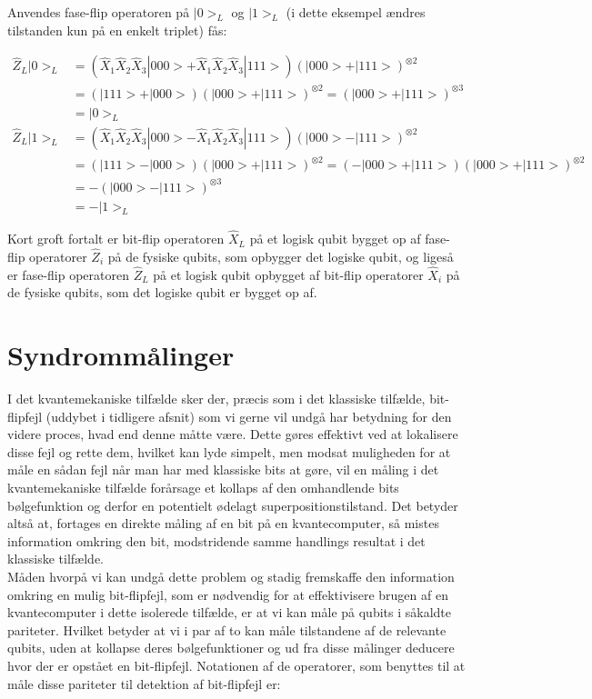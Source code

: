 \documentclass[a4paper,oneside,article]{memoir}
\begin{document}
Anvendes fase-flip operatoren på $|0>_L$ og $|1>_L$ (i dette eksempel ændres tilstanden kun på en enkelt triplet) fås:

\begin{align*}
    \hat{Z}_L|0>_L &= (\hat{X}_1\hat{X}_2\hat{X}_3|000> + \hat{X}_1\hat{X}_2\hat{X}_3|111>)(|000> + |111>)^{\otimes 2} \\&= (|111> + |000>)(|000> + |111>)^{\otimes 2} = (|000> + |111>)^{\otimes 3} \\&= |0>_L\\
    \hat{Z}_L|1>_L &= (\hat{X}_1\hat{X}_2\hat{X}_3|000> - \hat{X}_1\hat{X}_2\hat{X}_3|111>)(|000> - |111>)^{\otimes 2} \\&= (|111> - |000>)(|000> + |111>)^{\otimes 2} = (-|000> + |111>)(|000> + |111>)^{\otimes 2} \\&= -(|000> - |111>)^{\otimes 3} \\&= -|1>_L
\end{align*}

Kort groft fortalt er bit-flip operatoren $\hat{X}_L$ på et logisk qubit bygget op af fase-flip operatorer $\hat{Z}_i$ på de fysiske qubits, som opbygger det logiske qubit, og ligeså er fase-flip operatoren $\hat{Z}_L$ på et logisk qubit opbygget af bit-flip operatorer $\hat{X}_i$ på de fysiske qubits, som det logiske qubit er bygget op af.

\section {Syndrommålinger}
I det kvantemekaniske tilfælde sker der, præcis som i det klassiske tilfælde, bit-flipfejl (uddybet i tidligere afsnit) som vi gerne vil undgå har betydning for den videre proces, hvad end denne måtte være. Dette gøres effektivt ved at lokalisere disse fejl og rette dem, hvilket kan lyde simpelt, men modsat muligheden for at måle en sådan fejl når man har med klassiske bits at gøre, vil en måling i det kvantemekaniske tilfælde forårsage et kollaps af den omhandlende bits bølgefunktion og derfor en potentielt ødelagt superpositionstilstand. Det betyder altså at, fortages en direkte måling af en bit på en kvantecomputer, så mistes information omkring den bit, modstridende samme handlings resultat i det klassiske tilfælde. \\

Måden hvorpå vi kan undgå dette problem og stadig fremskaffe den information omkring en mulig bit-flipfejl, som er nødvendig for at effektivisere brugen af en kvantecomputer i dette isolerede tilfælde, er at vi kan måle på qubits i såkaldte pariteter. Hvilket betyder at vi i par af to kan måle tilstandene af de relevante qubits, uden at kollapse deres bølgefunktioner og ud fra disse målinger deducere hvor der er opstået en bit-flipfejl. Notationen af de operatorer, som benyttes til at måle disse pariteter til detektion af bit-flipfejl er: 
\end{document}
